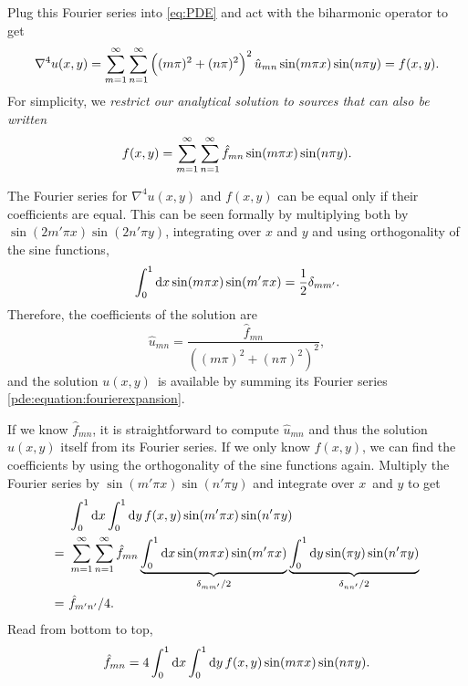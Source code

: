 Plug this Fourier series into \cref{eq:PDE} and act with the biharmonic operator to get
\begin{equation*}
\nabla^4 u(x,y) = \sum_{m=1}^{\infty} \sum_{n=1}^{\infty} \left((m\pi)^2+(n\pi)^2\right)^2 \hat{u}_{mn} \sin(m \pi x) \sin(n \pi y) = f(x,y).
\end{equation*}
For simplicity, we \emph{restrict our analytical solution to sources that can also be written}
\begin{equation}
	f(x,y) = \sum_{m=1}^{\infty} \sum_{n=1}^{\infty} \hat{f}_{mn} \sin(m \pi x) \sin(n \pi y).
\end{equation}

The Fourier series for $\nabla^4 u(x,y)$ and $f(x,y)$ can be equal only if their coefficients are equal.
This can be seen formally by multiplying both by $\sin(2m'\pi x) \sin(2n'\pi y)$, integrating over $x$ and $y$ and using orthogonality of the sine functions,
\begin{equation*}
	\integral{\sin(m\pi x) \sin(m' \pi x)}{x}{0}{1} = \frac{1}{2} \delta_{mm'}.
\end{equation*}
Therefore, the coefficients of the solution are
\begin{equation}
	\hat{u}_{mn} = \frac{\hat{f}_{mn}}{\left((m\pi)^2+(n\pi)^2\right)^2},
\end{equation}
and the solution $u(x,y)$ is available by summing its Fourier series \ref{pde:equation:fourierexpansion}.

If we know $\hat{f}_{mn}$, it is straightforward to compute $\hat{u}_{mn}$ and thus the solution $u(x,y)$ itself from its Fourier series.
If we only know $f(x,y)$, we can find the coefficients by using the orthogonality of the sine functions again.
Multiply the Fourier series by $\sin(m' \pi x) \sin(n' \pi y)$ and integrate over $x$ and $y$ to get
\begin{equation*}
\begin{split}
  & \,\, \integraltwo{f(x,y) \sin(m' \pi x) \sin(n' \pi y)}{x}{y}{0}{1}{0}{1} \\
= & \,\, \sum_{m=1}^{\infty} \sum_{n=1}^{\infty} \hat{f}_{mn} \underbrace{\integral{\sin(m\pi x)\sin(m'\pi x)}{x}{0}{1}}_{\delta_{mm'}/2} \underbrace{\integral{\sin(\pi y)\sin(n'\pi y)}{y}{0}{1}}_{\delta_{nn'}/2} \\
= & \,\, \hat{f}_{m'n'} / 4.
\end{split}
\end{equation*}
Read from bottom to top,
\begin{equation}
\hat{f}_{mn} = 4 \integraltwo{f(x,y) \sin(m \pi x) \sin(n \pi y)}{x}{y}{0}{1}{0}{1}.
\end{equation}

